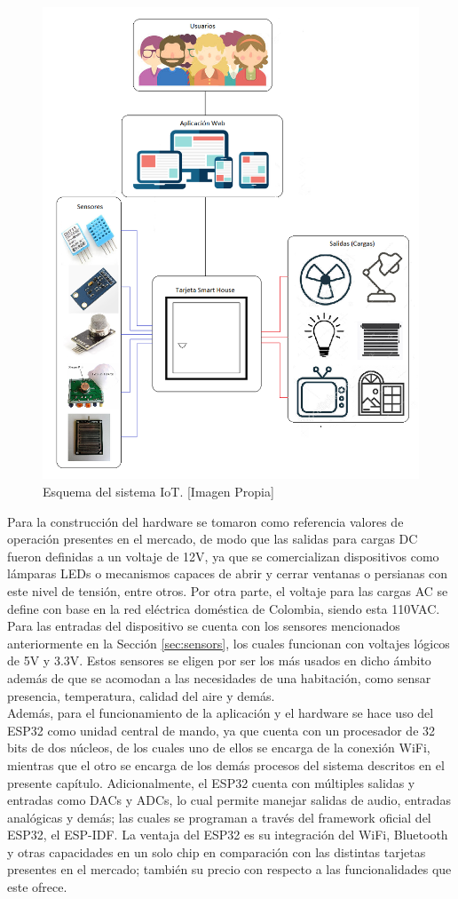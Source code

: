 \begin{figure}[H]
	\centering
	\caption[Esquema del sistema IoT.]{Esquema del sistema IoT. [Imagen Propia]}
	\label{fig:diagramas}
	\includegraphics[width=0.73\linewidth]{Imagenes/Diagramas}
\end{figure}

Para la construcción del hardware se tomaron como referencia valores de operación presentes en el mercado, de modo que las salidas para cargas DC fueron definidas a un voltaje de 12V, ya que se comercializan dispositivos como lámparas LEDs o mecanismos capaces de abrir y cerrar ventanas o persianas con este nivel de tensión, entre otros. Por otra parte, el voltaje para las cargas AC se define con base en la red eléctrica doméstica de Colombia, siendo esta 110VAC. Para las entradas del dispositivo se cuenta con los sensores mencionados anteriormente en la Sección \ref{sec:sensors}, los cuales funcionan con voltajes lógicos de 5V y 3.3V. Estos sensores se eligen por ser los más usados en dicho ámbito además de que se acomodan a las necesidades de una habitación, como sensar presencia, temperatura, calidad del aire y demás.\\

Además, para el funcionamiento de la aplicación y el hardware se hace uso del ESP32 como unidad central de mando, ya que cuenta con un procesador de 32 bits de dos núcleos, de los cuales uno de ellos se encarga de la conexión WiFi, mientras que el otro se encarga de los demás procesos del sistema descritos en el presente capítulo. Adicionalmente, el ESP32 cuenta con múltiples salidas y entradas como DACs y ADCs, lo cual permite manejar salidas de audio, entradas analógicas y demás; las cuales se programan a través del framework oficial del ESP32, el ESP-IDF. La ventaja del ESP32 es su integración del WiFi, Bluetooth y otras capacidades en un solo chip en comparación con las distintas tarjetas presentes en el mercado; también su precio con respecto a las funcionalidades que este ofrece.\\

